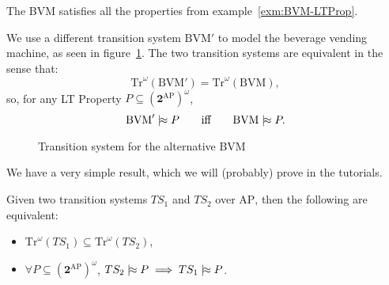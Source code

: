 \documentclass[./main]{subfiles}
\begin{document}
  \begin{exm}
    The BVM satisfies all the properties from example~\ref{exm:BVM-LTProp}.
  \end{exm}

  \begin{exm}
    We use a different transition system $\mathrm{BVM}'$ to model the beverage vending machine, as seen in figure~\ref{fig:bvm'-ts-label}.
    The two transition systems are equivalent in the sense that:
    \[
    \mathrm{Tr}^\omega(\mathrm{BVM}') = \mathrm{Tr}^\omega(\mathrm{BVM})
    ,\] so, for any LT Property $P \subseteq (\mathbf{2}^\mathrm{AP})^\omega$,
    \[
    \mathrm{BVM}' \mathrel{{|}\!{\approx}} P \quad\quad\text{iff} \quad\quad \mathrm{BVM} \mathrel{{|}\!{\approx}} P
    .\]
  \end{exm}

  \begin{figure}
    \centering
    \caption{Transition system for the alternative BVM}
    \label{fig:bvm'-ts-label}
  \end{figure}

  We have a very simple result, which we will (probably) prove in the tutorials.

  \begin{prop}
    Given two transition systems $TS_1$ and $TS_2$ over $\mathrm{AP}$, then the following are equivalent:
    \begin{itemize}
      \item $\mathrm{Tr}^\omega(TS_1) \subseteq \mathrm{Tr}^\omega(TS_2)$,
      \item $\forall P \subseteq (\mathbf{2}^\mathrm{AP})^\omega$, $TS_2 \mathrel{{|}\!{\approx}} P \implies TS_1 \mathrel{{|}\!{\approx}} P$.
    \end{itemize}
  \end{prop}
\end{document}
